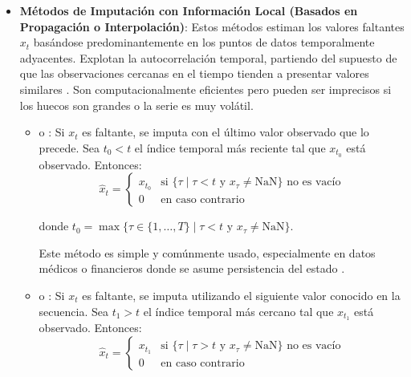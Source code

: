 \begin{itemize}
    \item \textbf{Métodos de Imputación con Información Local (Basados en Propagación o Interpolación)}:
    Estos métodos estiman los valores faltantes $x_t$ basándose predominantemente en los puntos de datos temporalmente adyacentes. Explotan la autocorrelación temporal, partiendo del supuesto de que las observaciones cercanas en el tiempo tienden a presentar valores similares \citep{Molenberghs2015handbook}. Son computacionalmente eficientes pero pueden ser imprecisos si los huecos son grandes o la serie es muy volátil.

        \begin{itemize}
            \item \textit{} o : Si $x_t$ es faltante, se imputa con el último valor observado que lo precede. Sea $t_0 < t$ el índice temporal más reciente tal que $x_{t_0}$ está observado. Entonces:
            \begin{equation}
            \hat{x}_t = 
            \begin{cases}
            x_{t_0} & \text{si } \{\tau \mid \tau < t \text{ y } x_\tau \ne \text{NaN}\} \text{ no es vacío} \\
            0 & \text{en caso contrario}
            \end{cases}\label{eq:locf}
            \end{equation}

            donde $t_0 = \max\{\tau \in \{1, \dots, T\} \mid \tau < t \text{ y } x_\tau \ne \text{NaN}\}$.
            
            Este método es simple y comúnmente usado, especialmente en datos médicos o financieros donde se asume persistencia del estado \citep{Shao1992handling}.

            \item \textit{} o : Si $x_t$ es faltante, se imputa utilizando el siguiente valor conocido en la secuencia. Sea $t_1 > t$ el índice temporal más cercano tal que $x_{t_1}$ está observado. Entonces:
            \begin{equation}
            \hat{x}_t = 
            \begin{cases}
            x_{t_1} & \text{si } \{\tau \mid \tau > t \text{ y } x_\tau \ne \text{NaN}\} \text{ no es vacío} \\
            0 & \text{en caso contrario}
            \end{cases}\label{eq:nocb}
            \end{equation}


\end{itemize}
\end{itemize}
